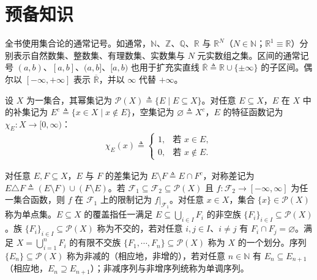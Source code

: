 \documentclass[../../main.tex]{subfiles}%
\begin{document}
\section{预备知识}\label{section:ch01-预备知识}

全书使用集合论的通常记号。如通常，$\mathbb{N}$、$\mathbb{Z}$、$\mathbb{Q}$、$\mathbb{R}$ 与 $\mathbb{R}^N$（$N\in\mathbb{N}$；$\mathbb{R}^1\equiv\mathbb{R}$）分别表示自然数集、整数集、有理数集、实数集与 $N$ 元实数组之集。区间的通常记号 $(a,b)$、$[a,b]$、$(a,b]$、$[a,b)$ 也用于扩充实直线 $\overline{\mathbb{R}}\triangleq\mathbb{R}\cup\{\pm\infty\}$ 的子区间。偶尔以 $[-\infty,+\infty]$ 表示 $\overline{\mathbb{R}}$，并以 $\infty$ 代替 $+\infty$。

设 $X$ 为一集合，其幂集记为 $\mathcal{P}(X)\triangleq\{E\mid E\subseteq X\}$。对任意 $E\subseteq X$，$E$ 在 $X$ 中的补集记为 $E^c\triangleq\{x\in X\mid x\notin E\}$，空集记为 $\varnothing\triangleq X^c$，$E$ 的特征函数记为 $\chi_E:X\to[0,\infty)$：
\begin{align*}
\chi_E(x)\triangleq
\begin{cases}
1, & \text{若 }x\in E,\\
0, & \text{若 }x\notin E.
\end{cases}
\end{align*}

对任意 $E,F\subseteq X$，$E$ 与 $F$ 的差集记为 $E\setminus F\triangleq E\cap F^c$，对称差记为 $E\triangle F\triangleq(E\setminus F)\cup(F\setminus E)$。若 $\mathcal{F}_1\subseteq\mathcal{F}_2\subseteq\mathcal{P}(X)$ 且 $f:\mathcal{F}_2\to[-\infty,\infty]$ 为任一集合函数，则 $f$ 在 $\mathcal{F}_1$ 上的限制记为 $f|_{\mathcal{F}_1}$。对任意 $x\in X$，集合 $\{x\}\in\mathcal{P}(X)$ 称为单点集。$E\subseteq X$ 的覆盖指任一满足 $E\subseteq\bigcup_{i\in I}F_i$ 的非空族 $\{F_i\}_{i\in I}\subseteq\mathcal{P}(X)$。族 $\{F_i\}_{i\in I}\subseteq\mathcal{P}(X)$ 称为不交的，若对任意 $i,j\in I$、$i\neq j$ 有 $F_i\cap F_j=\varnothing$。满足 $X=\bigcup_{i=1}^nF_i$ 的有限不交族 $\{F_1,\cdots,F_n\}\subseteq\mathcal{P}(X)$ 称为 $X$ 的一个划分。序列 $\{E_n\}\subseteq\mathcal{P}(X)$ 称为非减的（相应地，非增的），若对任意 $n\in\mathbb{N}$ 有 $E_n\subseteq E_{n+1}$（相应地，$E_n\supseteq E_{n+1}$）；非减序列与非增序列统称为单调序列。
\end{document}
